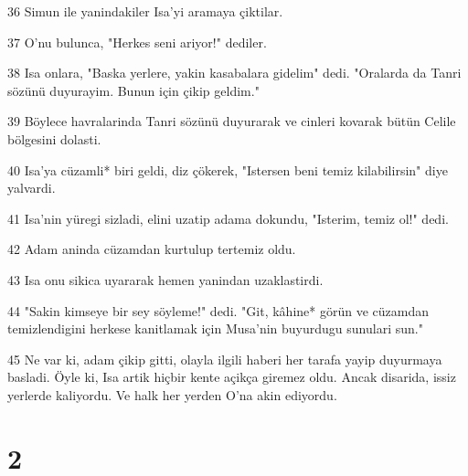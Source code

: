 \par 36 Simun ile yanindakiler Isa'yi aramaya çiktilar.
\par 37 O'nu bulunca, "Herkes seni ariyor!" dediler.
\par 38 Isa onlara, "Baska yerlere, yakin kasabalara gidelim" dedi. "Oralarda da Tanri sözünü duyurayim. Bunun için çikip geldim."
\par 39 Böylece havralarinda Tanri sözünü duyurarak ve cinleri kovarak bütün Celile bölgesini dolasti.
\par 40 Isa'ya cüzamli* biri geldi, diz çökerek, "Istersen beni temiz kilabilirsin" diye yalvardi.
\par 41 Isa'nin yüregi sizladi, elini uzatip adama dokundu, "Isterim, temiz ol!" dedi.
\par 42 Adam aninda cüzamdan kurtulup tertemiz oldu.
\par 43 Isa onu sikica uyararak hemen yanindan uzaklastirdi.
\par 44 "Sakin kimseye bir sey söyleme!" dedi. "Git, kâhine* görün ve cüzamdan temizlendigini herkese kanitlamak için Musa'nin buyurdugu sunulari sun."
\par 45 Ne var ki, adam çikip gitti, olayla ilgili haberi her tarafa yayip duyurmaya basladi. Öyle ki, Isa artik hiçbir kente açikça giremez oldu. Ancak disarida, issiz yerlerde kaliyordu. Ve halk her yerden O'na akin ediyordu.

\chapter{2}

